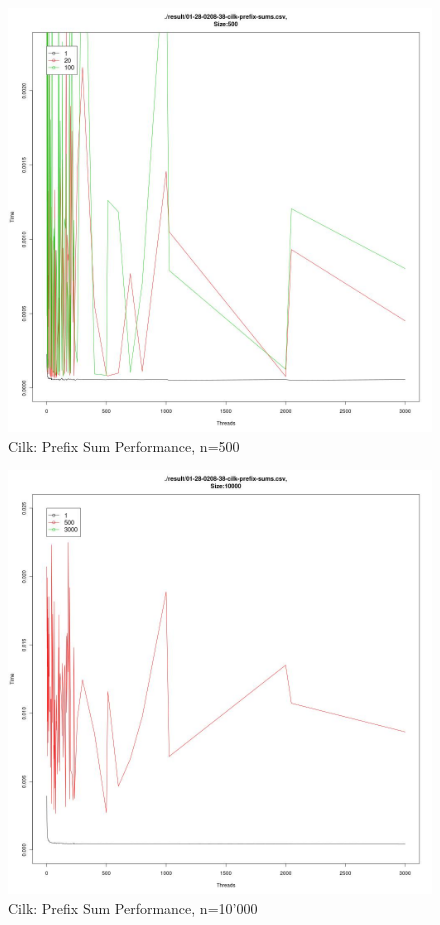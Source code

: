 \documentclass[11pt]{article}
\begin{document}
\begin{figure}[H]
\centering
\caption{Cilk: Prefix Sum Performance, n=500}

\includegraphics[scale=0.3]{candidate-graphs/cilk_by_threads_500.jpg}

\end{figure}

\begin{figure}[H]
\centering
\caption{Cilk: Prefix Sum Performance, n=10'000}

\includegraphics[scale=0.3]{candidate-graphs/cilk_by_threads_10000.jpg}

\end{figure}
\end{document}
